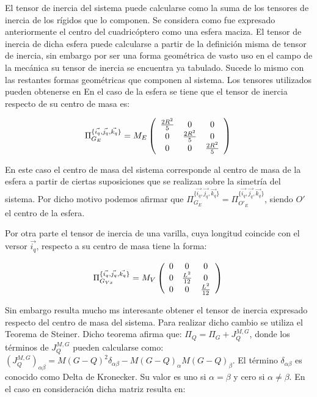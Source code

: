 \label{tensores}

El tensor de inercia del sistema puede calcularse como la suma de los tensores de inercia de los rígidos que lo componen. Se considera como fue expresado anteriormente el centro del cuadricóptero como una esfera maciza. El tensor de inercia de dicha esfera puede calcularse a partir de la definición misma de tensor de inercia, sin embargo por ser una forma geométrica de vasto uso en el campo de la mecánica su tensor de inercia se encuentra ya tabulado. Sucede lo mismo con las restantes formas geométricas que componen al sistema. Los tensores utilizados pueden obtenerse en \cite{bib:inercia} En el caso de la esfera se tiene que el tensor de inercia respecto de  su centro de masa es: 

$$
\Pi_{G_E}^{\{\vec{i_q}, \vec{j_q}, \vec{k_q}\}}= M_E\left(\begin{array}{ccc}
\frac{2R^2}{5}  &0&  0\\
0  &\frac{2R^2}{5} & 0\\
0  &0 & \frac{2R^2}{5} \\
\end{array}\right) \\
$$

En este caso el centro de masa del sistema corresponde al centro de masa de la esfera a partir de ciertas suposiciones que se realizan sobre la simetría del sistema. Por dicho motivo podemos afirmar que $\Pi_{G_E}^{\{\vec{i_q}, \vec{j_q}, \vec{k_q}\}} = \Pi_{O\prime _E}^{\{\vec{i_q}, \vec{j_q}, \vec{k_q}\}} $, siendo $O\prime$ el centro de la esfera.

Por otra parte el tensor de inercia de una varilla, cuya longitud coincide con el versor $\vec{i_q}$, respecto a su centro de masa tiene la forma:

$$
\Pi_{G_{Vx}}^{\{\vec{i_q}, \vec{j_q}, \vec{k_q}\}}= M_V\left(\begin{array}{ccc}
0  &0&  0\\
0  &\frac{L^2}{12} & 0\\
0  &0 & \frac{L^2}{12}  \\
\end{array}\right) \\ 
$$

Sin embargo resulta mucho ms interesante obtener el tensor de inercia expresado respecto del centro de masa del sistema. Para realizar dicho cambio se utiliza el Teorema de Steiner. Dicho teorema afirma que: $\Pi_Q = \Pi_G +J_Q^{M,G}$, donde los términos de $J_Q^{M,G}$ pueden calcularse como: $(J_Q^{M,G})_{\alpha \beta} = M(G-Q)^2\delta_{\alpha \beta}-M(G-Q)_{\alpha}M(G-Q)_{\beta}$. El término $\delta_{\alpha \beta}$ es conocido como Delta de Kronecker. Su valor es uno si $\alpha =\beta$ y cero si $\alpha \neq \beta$. En el caso en consideración dicha matriz resulta en:

